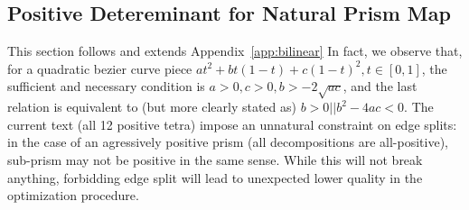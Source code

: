 \subsection{Positive Detereminant for Natural Prism Map}
This section follows and extends Appendix~\ref{app:bilinear}
In fact, we observe that, for a quadratic bezier curve piece $a t^2 + b t (1-t) + c (1-t)^2, t\in [0,1]$, the sufficient and necessary condition is $a>0, c>0, b > - 2 \sqrt{a c}$, and the last relation is equivalent to (but more clearly stated as) $b > 0 || b^2 - 4 a c < 0$.
The current text (all 12 positive tetra) impose an unnatural constraint on edge splits: in the case of an agressively positive prism (all decompositions are all-positive), sub-prism may not be positive in the same sense. While this will not break anything, forbidding edge split will lead to unexpected lower quality in the optimization procedure.
